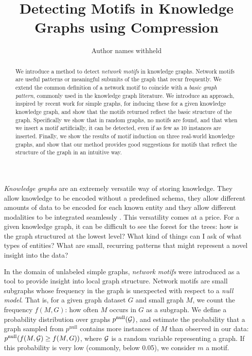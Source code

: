 \documentclass[letterpaper]{article} %
\title{Detecting Motifs in Knowledge Graphs using Compression}
\author{
Author names withheld
}
\newcommand{\G}{{\cal G}}
\begin{document}
\maketitle

\begin{abstract}
\noindent We introduce a method to detect \emph{network motifs} in knowledge graphs. Network motifs are useful patterns or meaningful subunits of the graph that recur frequently. We extend the common definition of a network motif to coincide with a \emph{basic graph pattern}, commonly used in the knowledge graph literature. We introduce an approach, inspired by recent work for simple graphs, for inducing these for a given knowledge knowledge graph, and show that the motifs returned reflect the basic structure of the graph. Specifically we show that in random graphs, no motifs are found, and that when we insert a motif artificially, it can be detected, even if as few as 10 instances are inserted. Finally, we show the results of motif induction on three real-world knowledge graphs, and show that our method provides good suggestions for motifs that reflect the structure of the graph in an intuitive way.
\end{abstract}

\noindent \emph{Knowledge graphs} are an extremely versatile way of storing knowledge. They allow knowledge to be encoded without a predefined schema, they allow different amounts of data to be encoded for each known entity and they allow different modalities to be integrated seamlessly \cite{wilcke2017knowledge}. This versatility comes at a price. For a given knowledge graph, it can be difficult to see the forest for the trees: how is the graph structured at the lowest level? What kind of things can I ask of what types of entities? What are small, recurring patterns that might represent a novel insight into the data?

In the domain of unlabeled simple graphs, \emph{network motifs} \cite{milo2002network} were introduced as a tool to provide insight into local graph structure. Network motifs are small subgraphs whose frequency in the graph is unexpected with respect to a \emph{null model}. That is, for a given graph dataset $G$ and small graph $M$, we count the frequency $f(M, G)$: how often $M$ occurs in $G$ as a subgraph. We define a probability distribution over graphs $p^\text{null}(\G)$, and estimate the probability that a graph sampled from $p^\text{null}$ contains more instances of $M$ than observed in our data: $p^\text{null}(f(M, \G) \geq f(M, G))$, where $\G$ is a random variable representing a graph. If this probability is very low (commonly, below 0.05), we consider $m$ a motif. \footnotemark
\end{document}
